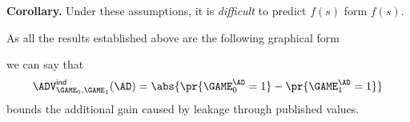 \documentclass[landscape,footrule]{foils}
\newcommand{\lastline}{\vspace*{-2ex}}
\begin{document}
\textbf{Corollary.} Under these assumptions, it is \emph{difficult} to
predict $f(s)$ form $f(s)$.\lastline


As all the results established above are the following graphical form


we can say that 
\begin{align*}
\advINDXX{\GAME_0,\GAME_1}{\AD}=\abs{\pr{\GAME_0^\AD=1}-\pr{\GAME_1^\AD=1}}  
\end{align*}
bounds the additional gain caused by leakage through  published values.
\lastline
\end{document}
